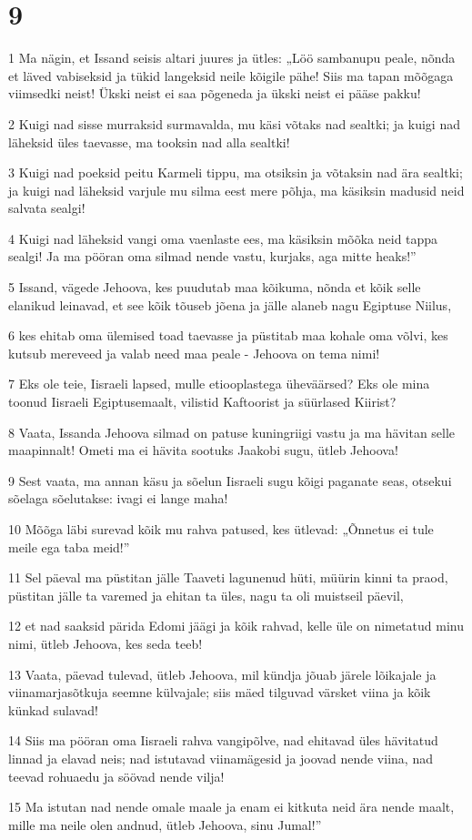 \chapter{9}

\par 1 Ma nägin, et Issand seisis altari juures ja ütles: „Löö sambanupu peale, nõnda et läved vabiseksid ja tükid langeksid neile kõigile pähe! Siis ma tapan mõõgaga viimsedki neist! Ükski neist ei saa põgeneda ja ükski neist ei pääse pakku!
\par 2 Kuigi nad sisse murraksid surmavalda, mu käsi võtaks nad sealtki; ja kuigi nad läheksid üles taevasse, ma tooksin nad alla sealtki!
\par 3 Kuigi nad poeksid peitu Karmeli tippu, ma otsiksin ja võtaksin nad ära sealtki; ja kuigi nad läheksid varjule mu silma eest mere põhja, ma käsiksin madusid neid salvata sealgi!
\par 4 Kuigi nad läheksid vangi oma vaenlaste ees, ma käsiksin mõõka neid tappa sealgi! Ja ma pööran oma silmad nende vastu, kurjaks, aga mitte heaks!”
\par 5 Issand, vägede Jehoova, kes puudutab maa kõikuma, nõnda et kõik selle elanikud leinavad, et see kõik tõuseb jõena ja jälle alaneb nagu Egiptuse Niilus,
\par 6 kes ehitab oma ülemised toad taevasse ja püstitab maa kohale oma võlvi, kes kutsub mereveed ja valab need maa peale - Jehoova on tema nimi!
\par 7 Eks ole teie, Iisraeli lapsed, mulle etiooplastega üheväärsed? Eks ole mina toonud Iisraeli Egiptusemaalt, vilistid Kaftoorist ja süürlased Kiirist?
\par 8 Vaata, Issanda Jehoova silmad on patuse kuningriigi vastu ja ma hävitan selle maapinnalt! Ometi ma ei hävita sootuks Jaakobi sugu, ütleb Jehoova!
\par 9 Sest vaata, ma annan käsu ja sõelun Iisraeli sugu kõigi paganate seas, otsekui sõelaga sõelutakse: ivagi ei lange maha!
\par 10 Mõõga läbi surevad kõik mu rahva patused, kes ütlevad: „Õnnetus ei tule meile ega taba meid!”
\par 11 Sel päeval ma püstitan jälle Taaveti lagunenud hüti, müürin kinni ta praod, püstitan jälle ta varemed ja ehitan ta üles, nagu ta oli muistseil päevil,
\par 12 et nad saaksid pärida Edomi jäägi ja kõik rahvad, kelle üle on nimetatud minu nimi, ütleb Jehoova, kes seda teeb!
\par 13 Vaata, päevad tulevad, ütleb Jehoova, mil kündja jõuab järele lõikajale ja viinamarjasõtkuja seemne külvajale; siis mäed tilguvad värsket viina ja kõik künkad sulavad!
\par 14 Siis ma pööran oma Iisraeli rahva vangipõlve, nad ehitavad üles hävitatud linnad ja elavad neis; nad istutavad viinamägesid ja joovad nende viina, nad teevad rohuaedu ja söövad nende vilja!
\par 15 Ma istutan nad nende omale maale ja enam ei kitkuta neid ära nende maalt, mille ma neile olen andnud, ütleb Jehoova, sinu Jumal!”




